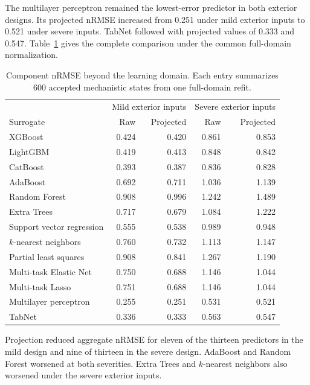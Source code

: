 The multilayer perceptron remained the lowest-error predictor in both exterior designs. Its projected nRMSE increased from 0.251 under mild exterior inputs to 0.521 under severe inputs. TabNet followed with projected values of 0.333 and 0.547. Table~\ref{tab:projection_exterior_results} gives the complete comparison under the common full-domain normalization.

\begin{table}[htbp]
\centering\small
\caption{Component nRMSE beyond the learning domain. Each entry summarizes 600 accepted mechanistic states from one full-domain refit. }
\label{tab:projection_exterior_results}
\begin{tabular}{p{4.5cm}rrrr}
\toprule
& \multicolumn{2}{c}{Mild exterior inputs} & \multicolumn{2}{c}{Severe exterior inputs}\\
Surrogate & Raw & Projected & Raw & Projected\\
\midrule
XGBoost & 0.424 & 0.420 & 0.861 & 0.853\\
LightGBM & 0.419 & 0.413 & 0.848 & 0.842\\
CatBoost & 0.393 & 0.387 & 0.836 & 0.828\\
AdaBoost & 0.692 & 0.711 & 1.036 & 1.139\\
Random Forest & 0.908 & 0.996 & 1.242 & 1.489\\
Extra Trees & 0.717 & 0.679 & 1.084 & 1.222\\
Support vector regression & 0.555 & 0.538 & 0.989 & 0.948\\
$k$-nearest neighbors & 0.760 & 0.732 & 1.113 & 1.147\\
Partial least squares & 0.908 & 0.841 & 1.267 & 1.190\\
Multi-task Elastic Net & 0.750 & 0.688 & 1.146 & 1.044\\
Multi-task Lasso & 0.751 & 0.688 & 1.146 & 1.044\\
Multilayer perceptron & 0.255 & 0.251 & 0.531 & 0.521\\
TabNet & 0.336 & 0.333 & 0.563 & 0.547\\
\bottomrule
\end{tabular}
\end{table}

Projection reduced aggregate nRMSE for eleven of the thirteen predictors in the mild design and nine of thirteen in the severe design. AdaBoost and Random Forest worsened at both severities. Extra Trees and $k$-nearest neighbors also worsened under the severe exterior inputs.

